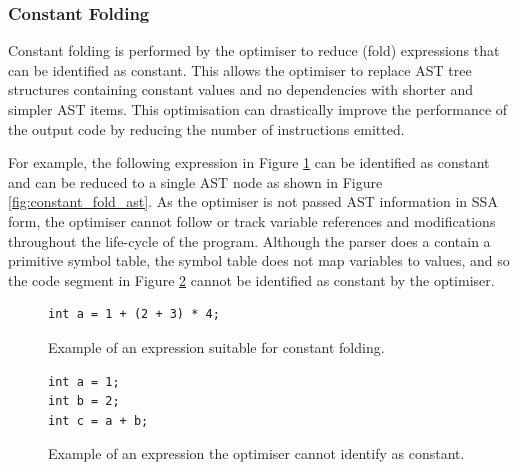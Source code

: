 \documentclass[11pt,a4paper]{report}
\begin{document}
\subsubsection{Constant Folding}
Constant folding is performed by the optimiser to reduce (fold) expressions that can be identified as constant. This allows the optimiser to replace AST tree structures containing constant values and no dependencies with shorter and simpler AST items. This optimisation can drastically improve the performance of the output code by reducing the number of instructions emitted.

For example, the following expression in Figure \ref{fig:constant_fold_yes} can be identified as constant and can be reduced to a single AST node as shown in Figure \ref{fig:constant_fold_ast}. As the optimiser is not passed AST information in SSA form, the optimiser cannot follow or track variable references and modifications throughout the life-cycle of the program. Although the parser does a contain a primitive symbol table, the symbol table does not map variables to values, and so the code segment in Figure \ref{fig:constant_fold_no} cannot be identified as constant by the optimiser.


\begin{figure}[H]
\centering 
\begin{minipage}{0.4\textwidth}
\begin{verbatim}
int a = 1 + (2 + 3) * 4;
\end{verbatim}
\end{minipage}
\caption{Example of an expression suitable for constant folding.}
\label{fig:constant_fold_yes}
\end{figure}

\begin{figure}[H]
\centering 
\begin{minipage}{0.4\textwidth}
\begin{verbatim}
int a = 1;
int b = 2;
int c = a + b;
\end{verbatim}
\end{minipage}
\caption{Example of an expression the optimiser cannot identify as constant.}
\label{fig:constant_fold_no}
\end{figure}
\end{document}
